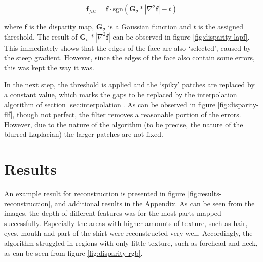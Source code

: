 \documentclass[journal]{IEEEtran}
\begin{document}
\begin{equation}
    \mathbf{f}_{filt} = \mathbf{f} \cdot \mathrm{sgn}\!\left(\mathbf{G}_\sigma * |\nabla^2\mathbf{f}| - t\right)
\end{equation}

where $ \mathbf{f} $ is the disparity map, $ \mathbf{G}_\sigma $ is a Gaussian function and $ t $ is the assigned threshold. The result of $ \mathbf{G}_\sigma * |\nabla^2\mathbf{f}| $ can be observed in figure \ref{fig:disparity-lapf}. This immediately shows that the edges of the face are also `selected', caused by the steep gradient. However, since the edges of the face also contain some errors, this was kept the way it was.

In the next step, the threshold is applied and the `spiky' patches are replaced by a constant value, which marks the gaps to be replaced by the interpolation algorithm of section \ref{sec:interpolation}. As can be observed in figure \ref{fig:disparity-flf}, though not perfect, the filter removes a reasonable portion of the errors. However, due to the nature of the algorithm (to be precise, the nature of the blurred Laplacian) the larger patches are not fixed.


\section{Results}

An example result for reconstruction is presented in figure \ref{fig:results-reconstruction}, and additional results in the Appendix.
As can be seen from the images, the depth of different features was for the most parts mapped successfully.
Especially the areas with higher amounts of texture, such as hair, eyes, mouth and part of the shirt were reconstructed very well. 
Accordingly, the algorithm struggled in regions with only little texture, such as forehead and neck, as can be seen from figure \ref{fig:disparity-rgb}.
\end{document}
